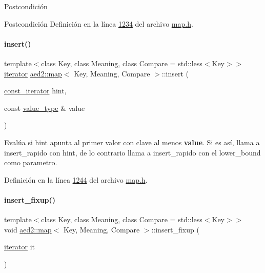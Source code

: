 \begin{DoxyPostcond}{\-Postcondición}
\begin{DoxyPostcond}{\-Postcondición}
Definición en la línea \hyperlink{map_8h_source_l01234}{1234} del archivo \hyperlink{map_8h_source}{map.\+h}.

\mbox{\label{classaed2_1_1map_a6941cde9a79c27f054b5c97a587a1854_a6941cde9a79c27f054b5c97a587a1854}} 
\paragraph{\texorpdfstring{insert()}{insert()}\hspace{0.1cm}{\footnotesize\ttfamily [2/2]}}
{\footnotesize\ttfamily template$<$class Key, class Meaning, class Compare = std\+::less$<$\+Key$>$$>$ \\
\hyperlink{classaed2_1_1map_1_1iterator}{iterator} \hyperlink{classaed2_1_1map}{aed2\+::map}$<$ Key, Meaning, Compare $>$\+::insert (\begin{DoxyParamCaption}\item[{\hyperlink{classaed2_1_1map_1_1const__iterator}{const\+\_\+iterator}}]{hint,  }\item[{const \hyperlink{classaed2_1_1map_a719db98e0ff9a837610f76be33264680_a719db98e0ff9a837610f76be33264680}{value\+\_\+type} \&}]{value }\end{DoxyParamCaption})\hspace{0.3cm}{\ttfamily [inline]}}

Evalúa si hint apunta al primer valor con clave al menos {\bfseries value}. Si es así, llama a insert\+\_\+rapido con hint, de lo contrario llama a insert\+\_\+rapido con el lower\+\_\+bound como parametro. 

Definición en la línea \hyperlink{map_8h_source_l01244}{1244} del archivo \hyperlink{map_8h_source}{map.\+h}.

\mbox{\label{classaed2_1_1map_ac9197851fe5b217d45d58bbaf3612c75_ac9197851fe5b217d45d58bbaf3612c75}} 
\paragraph{\texorpdfstring{insert\+\_\+fixup()}{insert\_fixup()}}
{\footnotesize\ttfamily template$<$class Key, class Meaning, class Compare = std\+::less$<$\+Key$>$$>$ \\
void \hyperlink{classaed2_1_1map}{aed2\+::map}$<$ Key, Meaning, Compare $>$\+::insert\+\_\+fixup (\begin{DoxyParamCaption}\item[{\hyperlink{classaed2_1_1map_1_1iterator}{iterator}}]{it }\end{DoxyParamCaption})\hspace{0.3cm}{\ttfamily [inline]}}


\end{DoxyPostcond}
\end{DoxyPostcond}
